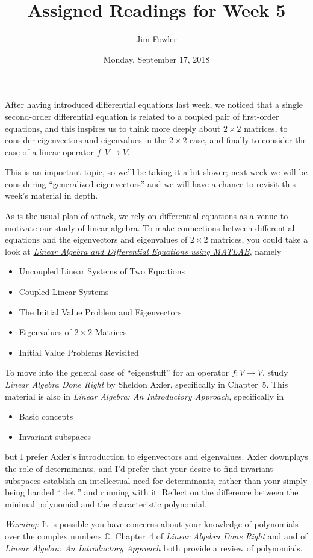\documentclass{homework}
\author{Jim Fowler}
\title{Assigned Readings for Week 5}
\date{Monday, September 17, 2018}
\begin{document}
\maketitle

After having introduced differential equations last week, we noticed
that a single second-order differential equation is related to a
coupled pair of first-order equations, and this inspires us to think
more deeply about $2 \times 2$ matrices, to consider eigenvectors and
eigenvalues in the $2 \times 2$ case, and finally to consider the case
of a linear operator $f : V \to V$.

This is an important topic, so we'll be taking it a bit slower; next
week we will be considering ``generalized eigenvectors'' and we will
have a chance to revisit this week's material in depth.

As is the usual plan of attack, we rely on differential equations as a
venue to motivate our study of linear algebra.  To make connections
between differential equations and the eigenvectors and eigenvalues of
$2 \times 2$ matrices, you could take a look at
\textit{\href{/files/68710154}{Linear Algebra
    and Differential Equations using MATLAB}}, namely
\begin{itemize}
\item {} Uncoupled Linear Systems of Two Equations
\item {} Coupled Linear Systems
\item {} The Initial Value Problem and Eigenvectors
\item {} Eigenvalues of $2\times 2$ Matrices
\item {} Initial Value Problems Revisited  
\end{itemize}

To move into the general case of ``eigenstuff'' for an operator
$f : V \to V$, study \textit{Linear Algebra Done Right} by Sheldon
Axler, specifically in Chapter~5.  This material is also in
\textit{Linear Algebra: An Introductory Approach}, specifically in
\begin{itemize}
\item {} Basic concepts
\item {} Invariant subspaces
\end{itemize}
but I prefer Axler's introduction to eigenvectors and eigenvalues.
Axler downplays the role of determinants, and I'd prefer that your
desire to find invariant subspaces establish an intellectual need for
determinants, rather than your simply being handed ``$\det$'' and
running with it.  Reflect on the difference between the minimal
polynomial and the characteristic polynomial.

\textit{Warning:} It is possible you have concerns about your
knowledge of polynomials over the complex numbers $\mathbb{C}$.
Chapter~4 of \textit{Linear Algebra Done Right} and 
and  of \textit{Linear Algebra: An Introductory
  Approach} both provide a review of polynomials.
\end{document}
